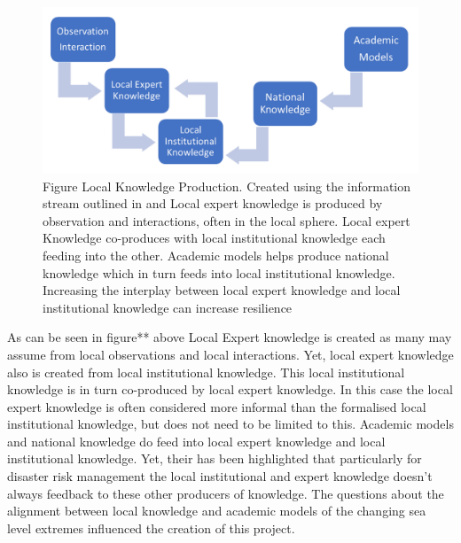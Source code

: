 \begin{figure}[h]
    \centering
    \includegraphics[width=1\textwidth]{fig_theory/local knowledge accumulation.png}
    \caption{Figure Local Knowledge Production. Created using the information stream outlined in \cite{setten_we_2019} and \cite{rod_integrated_2012} Local expert knowledge is produced by observation and interactions, often in the local sphere. Local expert Knowledge co-produces with local institutional knowledge each feeding into the other. Academic models helps produce national knowledge which in turn feeds into local institutional knowledge. Increasing the interplay between local expert knowledge and local institutional knowledge can increase resilience \cite{setten_we_2019}}
    \label{fig:local_knowledge}
\end{figure}


As can be seen in figure** above Local Expert knowledge is created as many may assume from local observations and local interactions. Yet, local expert knowledge also is created from local institutional knowledge. This local institutional knowledge is in turn co-produced by local expert knowledge. In this case the local expert knowledge is often considered more informal than the formalised local institutional knowledge, but does not need to be limited to this.  Academic models and national knowledge do feed into local expert knowledge and local institutional knowledge. Yet, their has been highlighted that particularly for disaster risk management the local institutional and expert knowledge doesn't always feedback to these other producers of knowledge\cite{rod_integrated_2012}. The questions about the alignment between local knowledge and academic models of the changing sea level extremes influenced the creation of this project. 

\paragraph{}

